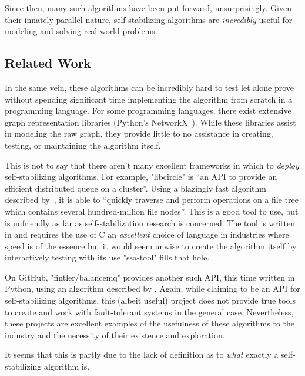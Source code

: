 Since then, many such algorithms have been put forward, unsurprisingly.
Given their innately parallel nature,
  self-stabilizing algorithms are \emph{incredibly} useful
  for modeling and solving real-world problems.

\subsection{Related Work}
\label{sec:introduction:related-work}
In the same vein, these algorithms can be incredibly hard to test
  \Dash let alone prove \Dash
  without spending significant time implementing the algorithm
  from scratch in a programming language.
For some programming languages,
  there exist extensive graph representation libraries
  (\eg Python's NetworkX~\autocite{hagberg:networkx}).
While these libraries assist in modeling the raw graph,
  they provide little to no assistance in creating, testing, or maintaining the algorithm itself.

This is not to say that there aren't many excellent frameworks in which to \emph{deploy} self-stabilizing algorithms.
For example, "libcircle" is \enquote{an API to provide an efficient distributed queue on a cluster}.
Using a blazingly fast algorithm described by~\autocite{lafon:libcircle},
  it is able to \enquote{quickly traverse and perform operations on a file tree which contains several hundred-million file nodes}.
This is a good tool to use, but is unfriendly as far as self-stabilization research is concerned.
The tool is written in and requires the use of C
  \Dash an \emph{excellent} choice of language in industries where speed is of the essence \Dash
but it would seem unwise to create the algorithm itself by interactively testing with its use \Dash "ssa-tool" fills that hole.

On GitHub, "fintler/balancemq" provides another such API, this time written in Python,
  using an algorithm described by \autocite{lafon:balanceMQ}.
Again, while claiming to be an API for self-stabilizing algorithms,
  this (albeit useful) project does not provide true tools to create and work with fault-tolerant systems in the general case.
Nevertheless, these projects are excellent examples of the usefulness of these algorithms to the industry and
  the necessity of their existence and exploration.

It seems that this is partly due to the lack of definition as to
  \emph{what} exactly a self-stabilizing algorithm is.

